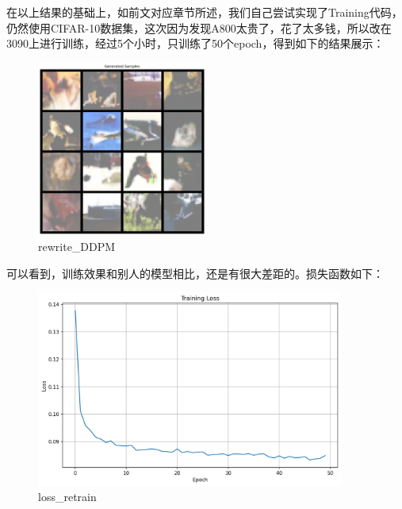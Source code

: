 \documentclass{ctexart}
\begin{document}
\noindent
在以上结果的基础上，如前文对应章节所述，我们自己尝试实现了Training代码，仍然使用CIFAR-10数据集，这次因为发现A800太贵了，花了太多钱，所以改在3090上进行训练，经过5个小时，只训练了50个epoch，得到如下的结果展示：
\begin{figure}[H]
     \centering
     \includegraphics[width=0.5\textwidth]{epoch_50_samples_retrain.png}
     \caption{rewrite\_DDPM}
     \label{fig:rewrite_ddpm}  %
\end{figure}

\noindent
可以看到，训练效果和别人的模型相比，还是有很大差距的。损失函数如下：
\begin{figure}[H]
     \centering
     \includegraphics[width=0.9\textwidth]{loss_retrain.png}
     \caption{loss\_retrain}
     \label{fig:loss_retrain}  %
\end{figure}
\end{document}
